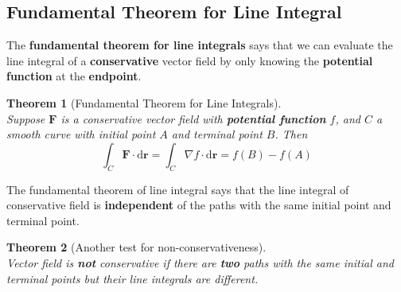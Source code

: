 \documentclass[12pt]{article}
\newtheorem{theorem}{Theorem}[section]
\theoremstyle{definition}
\newcommand{\diff}{\mathrm{d}}
\begin{document}
\subsection{Fundamental Theorem for Line Integral}
The \textbf{fundamental theorem for line integrals} says that we can evaluate the line integral of a \textbf{conservative} vector field by only knowing the \textbf{potential function} at the \textbf{endpoint}.
\begin{theorem}[Fundamental Theorem for Line Integrals]
\hfill\\\normalfont Suppose $\mathbf{F}$ is a conservative vector field with \textbf{potential function} $f$, and $C$ a smooth curve with \textit{initial} point $A$ and \textit{terminal} point $B$. Then
\[
\int_C\mathbf{F}\cdot\diff\mathbf{r} = \int_C\nabla f\cdot \diff \mathbf{r} = f(B)-f(A)
\] 
\end{theorem}
The fundamental theorem of line integral says that the line integral of conservative field is \textbf{independent} of the paths with the same initial point and terminal point.\\
\begin{theorem}[Another test for non-conservativeness]
\hfill\\\normalfont Vector field is \textbf{not} conservative if there are \textbf{two} paths with the same initial and terminal points but their line integrals are \textit{different}.
\end{theorem}
\clearpage
\end{document}
